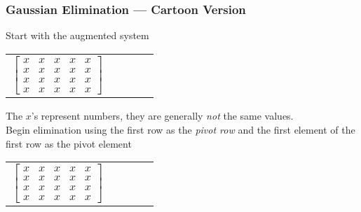 \documentclass[10pt]{beamer}
\begin{document}
\begin{frame}
\frametitle{Gaussian Elimination --- Cartoon Version}

Start with the augmented system
\begin{center}
    \begin{tabular}{ccccc}
        $\begin{bmatrix}   x  & x & x & x    & x \\
                           x  & x  & x  & x  & x  \\
                           x  & x  & x  & x  & x \\
                           x  & x  & x  & x  & x \end{bmatrix}$
     \end{tabular}
\end{center}
The $x$'s represent numbers, they are generally \emph{not} the same
values.\\
\vspace{0.5cm}
Begin elimination using the first row as the \emph{pivot row}
and the first element of the first row as the pivot
element
\begin{center}
    \begin{tabular}{ccccc}
        $\begin{bmatrix}\boxed{x} & x & x & x & x \\
                           x  & x  & x  & x  & x  \\
                           x  & x  & x  & x  & x \\
                           x  & x  & x  & x  & x \end{bmatrix}$
     \end{tabular}
\end{center}

\end{frame}
\end{document}
